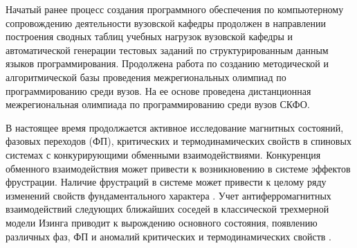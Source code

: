 

%
%







Начатый ранее процесс создания программного обеспечения по компьютерному сопровождению деятельности вузовской кафедры продолжен в направлении построения сводных таблиц учебных нагрузок вузовской кафедры и автоматической генерации тестовых заданий по структурированным данным языков программирования.
Продолжена работа по созданию методической и алгоритмической базы проведения межрегиональных олимпиад по программированию среди вузов. На ее основе проведена дистанционная межрегиональная олимпиада по программированию среди вузов СКФО.









В настоящее время продолжается активное исследование магнитных состояний, фазовых переходов (ФП), критических и термодинамических свойств в спиновых системах с конкурирующими обменными взаимодействиями. Конкуренция обменного взаимодействия может привести к возникновению в системе эффектов фрустрации. Наличие фрустраций в системе может привести к целому ряду изменений свойств фундаментального характера \cite{ph1_1, ph1_2, ph1_3}. Учет антиферромагнитных взаимодействий следующих ближайших соседей в классической трехмерной модели Изинга приводит к вырождению основного состояния, появлению различных фаз, ФП и аномалий критических и термодинамических свойств \cite{ph1_4}.

